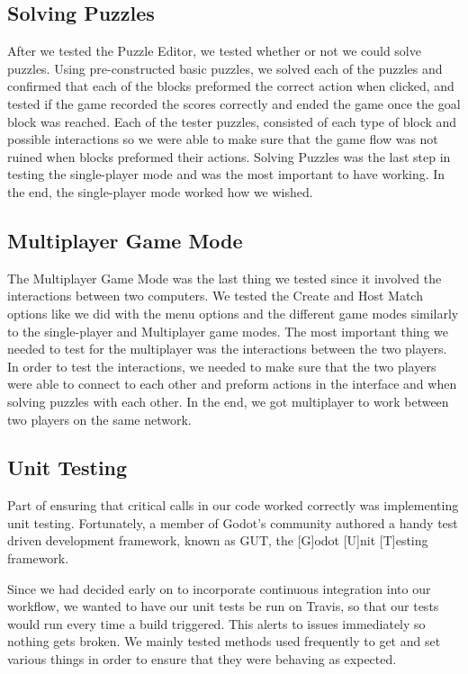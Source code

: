 \documentclass[12pt]{article}
\begin{document}
\subsection{Solving Puzzles}
After we tested the Puzzle Editor, we tested whether or not we could solve puzzles. Using pre-constructed basic puzzles, we solved each of the puzzles and confirmed that each of the blocks preformed the correct action when clicked, and tested if the game recorded the scores correctly and ended the game once the goal block was reached. Each of the tester puzzles, consisted of each type of block and possible interactions so we were able to make sure that the game flow was not ruined when blocks preformed their actions. Solving Puzzles was the last step in testing the single-player mode and was the most important to have working. In the end, the single-player mode worked how we wished.

\subsection{Multiplayer Game Mode}
The Multiplayer Game Mode was the last thing we tested since it involved the interactions between two computers. We tested the Create and Host Match options like we did with the menu options and the different game modes similarly to the single-player and Multiplayer game modes. The most important thing we needed to test for the multiplayer was the interactions between the two players. In order to test the interactions, we needed to make sure that the two players were able to connect to each other and preform actions in the interface and when solving puzzles with each other. In the end, we got multiplayer to work between two players on the same network.

\subsection{Unit Testing}
Part of ensuring that critical calls in our code worked correctly was implementing unit testing. Fortunately, a member of Godot's community authored a handy test driven development framework, known as GUT, the [G]odot [U]nit [T]esting framework. \cite{gut:tdd} 

Since we had decided early on to incorporate continuous integration into our workflow, we wanted to have our unit tests be run on Travis, so that our tests would run every time a build triggered. This alerts to issues immediately so nothing gets broken. We mainly tested methods used frequently to get and set various things in order to ensure that they were behaving as expected. 
\end{document}
